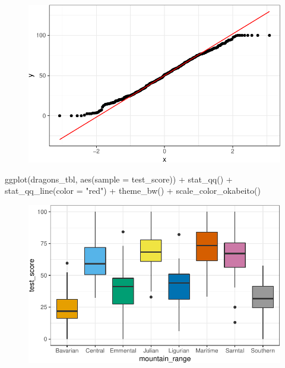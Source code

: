 \documentclass[
  letterpaper,
]{scrbook}
\newenvironment{Shaded}{\begin{snugshade}}{\end{snugshade}}
\newcommand{\AttributeTok}[1]{\textcolor[rgb]{0.40,0.45,0.13}{#1}}
\newcommand{\FunctionTok}[1]{\textcolor[rgb]{0.28,0.35,0.67}{#1}}
\newcommand{\NormalTok}[1]{\textcolor[rgb]{0.00,0.23,0.31}{#1}}
\newcommand{\SpecialCharTok}[1]{\textcolor[rgb]{0.37,0.37,0.37}{#1}}
\newcommand{\StringTok}[1]{\textcolor[rgb]{0.13,0.47,0.30}{#1}}
\begin{document}
\begin{figure}[H]

{\centering \includegraphics{./stat-modeling-mixed_files/figure-pdf/unnamed-chunk-8-1.pdf}

}

\end{figure}

\begin{Shaded}
\begin{Highlighting}[]
\FunctionTok{ggplot}\NormalTok{(dragons\_tbl, }\FunctionTok{aes}\NormalTok{(}\AttributeTok{sample =}\NormalTok{ test\_score)) }\SpecialCharTok{+}
  \FunctionTok{stat\_qq}\NormalTok{() }\SpecialCharTok{+} \FunctionTok{stat\_qq\_line}\NormalTok{(}\AttributeTok{color =} \StringTok{"red"}\NormalTok{) }\SpecialCharTok{+}
  \FunctionTok{theme\_bw}\NormalTok{() }\SpecialCharTok{+}
  \FunctionTok{scale\_color\_okabeito}\NormalTok{()}
\end{Highlighting}
\end{Shaded}

\begin{figure}[H]

{\centering \includegraphics{./stat-modeling-mixed_files/figure-pdf/unnamed-chunk-9-1.pdf}

}

\end{figure}
\end{document}
